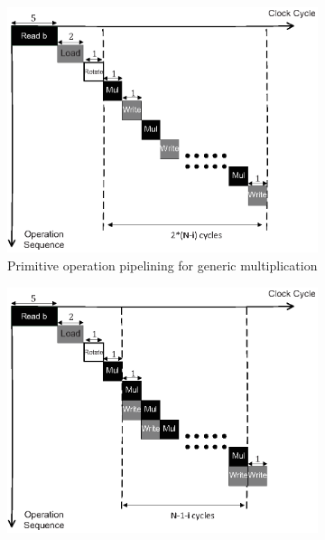 \documentclass[preprint]{iacrtrans}
\begin{document}


\begin{figure}[!tb]
\centering
\begin{subfigure}[t]{0.47\textwidth}\centering
\includegraphics[width=\textwidth]{./fig/pipeline_dsnmul.eps}
\caption{Primitive operation pipelining for generic multiplication}
\label{fig:pipeline_gmul}
\end{subfigure}
\hspace{1em}
\begin{subfigure}[t]{0.47\textwidth}\centering
\includegraphics[width=\textwidth]{./fig/pipeline_dsnmul2.eps}

\end{subfigure}
\end{figure}
\end{document}
